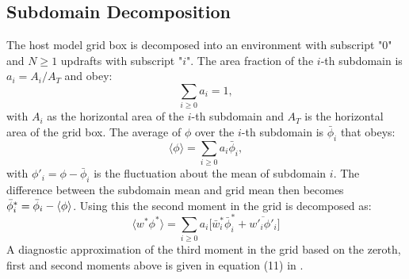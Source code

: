 \documentclass{report}
\begin{document}
\subsection{Subdomain Decomposition} \label{sec:Subdomain Decomposition}
The host model grid box is decomposed into an environment with subscript "$0$" and $N \ge 1$ updrafts with subscript "$i$". The area fraction of the $i$-th subdomain is $a_i=A_i/A_T$ and obey:
\begin{equation}
\sum_{i\ge 0} a_i = 1,
\label{eq:area_fraction}
\end{equation}
with $A_i$ as the horizontal area of the $i$-th subdomain and $A_T$ is the horizontal area of the grid box. The average of $\phi$ over the $i$-th subdomain is $\bar{\phi}_i$ that obeys:
\begin{equation}
\langle \phi \rangle = \sum_{i\ge 0} a_i \bar{\phi}_i,
\label{eq:subdomain_mean}
\end{equation}
with $\phi'_i = \phi - \bar{\phi}_i$ is the fluctuation about the mean of subdomain $i$. The difference between the subdomain mean and grid mean then becomes $\Bar{\phi}^*_i = \bar{\phi}_i - \langle\phi \rangle$. Using this the second moment in the grid is decomposed as:
\begin{equation}
\langle w^*\phi^* \rangle =  
\sum_{i\ge 0} a_i\Big[\bar{w}^*_i\bar{\phi}^*_i + \overline{w'_i\phi'_i} \Big] 
\label{eq:second_moment_decomposition}
\end{equation}
A diagnostic approximation of the third moment in the grid based on the zeroth, first and second moments above is given in equation (11) in \cite{cohen_2020}.
\end{document}
